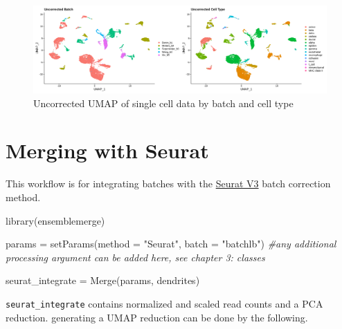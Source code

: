 \documentclass[
]{book}
\newenvironment{Shaded}{\begin{snugshade}}{\end{snugshade}}
\newcommand{\AttributeTok}[1]{\textcolor[rgb]{0.77,0.63,0.00}{#1}}
\newcommand{\CommentTok}[1]{\textcolor[rgb]{0.56,0.35,0.01}{\textit{#1}}}
\newcommand{\FunctionTok}[1]{\textcolor[rgb]{0.00,0.00,0.00}{#1}}
\newcommand{\NormalTok}[1]{#1}
\newcommand{\OtherTok}[1]{\textcolor[rgb]{0.56,0.35,0.01}{#1}}
\newcommand{\StringTok}[1]{\textcolor[rgb]{0.31,0.60,0.02}{#1}}
\begin{document}
\begin{figure}

{\centering \includegraphics[width=33.33in,height=0.8\textheight]{_book/ensemblemerge_files/images/uncorrected_batch} 

}

\caption{Uncorrected UMAP of single cell data by batch and cell type}\label{fig:unnamed-chunk-9}
\end{figure}

\hypertarget{merging-with-seurat}{%
\section{Merging with Seurat}\label{merging-with-seurat}}

This workflow is for integrating batches with the \href{'https://satijalab.org/seurat/articles/integration_introduction.html'}{Seurat V3} batch correction method.

\begin{Shaded}
\begin{Highlighting}[]
\FunctionTok{library}\NormalTok{(ensemblemerge)}

\NormalTok{params }\OtherTok{=} \FunctionTok{setParams}\NormalTok{(}\AttributeTok{method =} \StringTok{"Seurat"}\NormalTok{, }\AttributeTok{batch =} \StringTok{"batchlb"}\NormalTok{) }\CommentTok{\#any additional processing argument can be added here, see chapter 3: classes}

\NormalTok{seurat\_integrate }\OtherTok{=} \FunctionTok{Merge}\NormalTok{(params, dendrites)}
\end{Highlighting}
\end{Shaded}

\texttt{seurat\_integrate} contains normalized and scaled read counts and a PCA reduction. generating a UMAP reduction can be done by the following.
\end{document}
